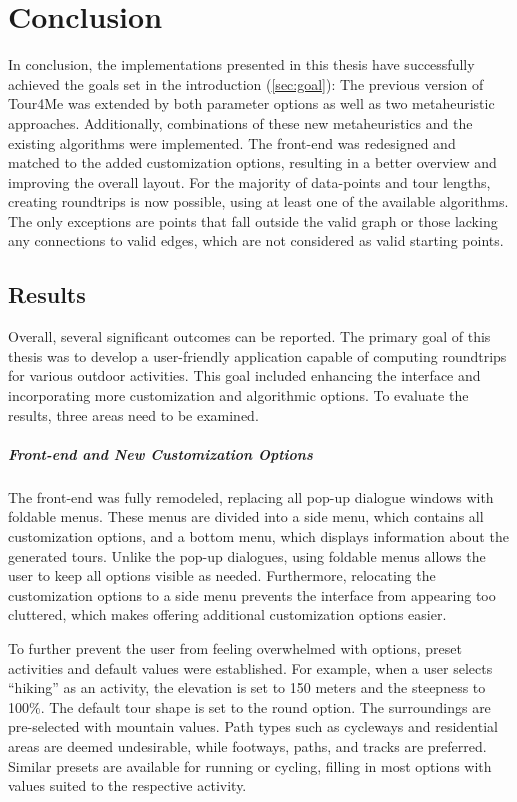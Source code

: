 \chapter{Conclusion}
\label{chapter:conclusion}

In conclusion, the implementations presented in this thesis have successfully achieved the goals set in the introduction (\ref{sec:goal}):
The previous version of Tour4Me was extended by both parameter options as well as two metaheuristic approaches. 
Additionally, combinations of these new metaheuristics and the existing algorithms were implemented.
The front-end was redesigned and matched to the added customization options, resulting in a better overview and improving the overall layout.
For the majority of data-points and tour lengths, creating roundtrips is now possible, using at least one of the available algorithms. 
The only exceptions are points that fall outside the valid graph or those lacking any connections to valid edges, which are not considered as valid starting points.

\section{Results}
\label{sec:results}

Overall, several significant outcomes can be reported.
The primary goal of this thesis was to develop a user-friendly application capable of computing roundtrips for various outdoor activities.
This goal included enhancing the interface and incorporating more customization and algorithmic options.
To evaluate the results, three areas need to be examined.

\paragraph{Front-end and New Customization Options}

The front-end was fully remodeled, replacing all pop-up dialogue windows with foldable menus.
These menus are divided into a side menu, which contains all customization options, and a bottom menu, which displays information about the generated tours. 
Unlike the pop-up dialogues, using foldable menus allows the user to keep all options visible as needed.
Furthermore, relocating the customization options to a side menu prevents the interface from appearing too cluttered, which makes offering additional customization options easier.

To further prevent the user from feeling overwhelmed with options, preset activities and default values were established.
For example, when a user selects \enquote{hiking} as an activity, the elevation is set to 150 meters and the steepness to 100\%.
The default tour shape is set to the round option.
The surroundings are pre-selected with mountain values.
Path types such as cycleways and residential areas are deemed undesirable, while footways, paths, and tracks are preferred.
Similar presets are available for running or cycling, filling in most options with values suited to the respective activity.

